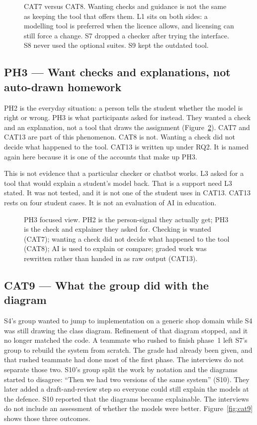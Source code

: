 \begin{figure}[htbp]
\centering

\caption{CAT7 versus CAT8. Wanting checks and guidance is not the same as keeping the tool that offers them. L1 sits on both sides: a modelling tool is preferred when the licence allows, and licensing can still force a change. S7 dropped a checker after trying the interface. S8 never used the optional suites. S9 kept the outdated tool.}
\label{fig:cat7_cat8}
\end{figure}

\subsection{PH3 --- Want checks and explanations, not auto-drawn homework}
\label{sec:ph3}

PH2 is the everyday situation: a person tells the student whether the model is right or wrong. PH3 is what participants asked for instead. They wanted a check and an explanation, not a tool that draws the assignment (Figure~\ref{fig:ph3}). CAT7 and CAT13 are part of this phenomenon. CAT8 is not. Wanting a check did not decide what happened to the tool. CAT13 is written up under RQ2. It is named again here because it is one of the accounts that make up PH3.

This is not evidence that a particular checker or chatbot works. L3 asked for a tool that would explain a student's model back. That is a support need L3 stated. It was not tested, and it is not one of the student uses in CAT13. CAT13 rests on four student cases. It is not an evaluation of AI in education.

\begin{figure}[htbp]
\centering

\caption{PH3 focused view. PH2 is the person-signal they actually get; PH3 is the check and explainer they asked for. Checking is wanted (CAT7); wanting a check did not decide what happened to the tool (CAT8); AI is used to explain or compare; graded work was rewritten rather than handed in as raw output (CAT13).}
\label{fig:ph3}
\end{figure}

\subsection{CAT9 --- What the group did with the diagram}
\label{sec:cat9}

S4's group wanted to jump to implementation on a generic shop domain while S4 was still drawing the class diagram. Refinement of that diagram stopped, and it no longer matched the code. A teammate who rushed to finish phase~1 left S7's group to rebuild the system from scratch. The grade had already been given, and that rushed teammate had done most of the first phase. The interviews do not separate those two. S10's group split the work by notation and the diagrams started to disagree: ``Then we had two versions of the same system'' (S10). They later added a draft-and-review step so everyone could still explain the models at the defence. S10 reported that the diagrams became explainable. The interviews do not include an assessment of whether the models were better. Figure~\ref{fig:cat9} shows those three outcomes.

